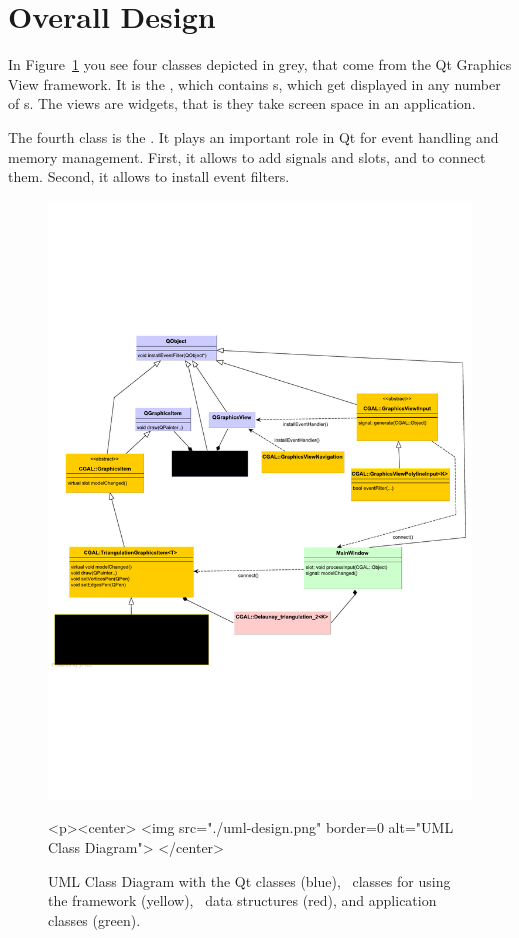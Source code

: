 \section{Overall Design}

In Figure~\ref{graphicsview:uml} you see four classes depicted in grey,
that come from the Qt Graphics View framework. It is the ,
which contains s, which get displayed in any number
of s. The views are widgets, that is they take screen space
in an application.

The fourth class is the . It plays an important role in Qt for
event handling and memory management. First, it allows to add signals and
slots, and to connect them.  Second, it allows to install event filters.


\begin{figure}[t]
\begin{ccTexOnly}
  \begin{center}
  \includegraphics[width=\linewidth]{GraphicsView/uml-design}
  \end{center}
\end{ccTexOnly}
\begin{ccHtmlOnly}
  <p><center>
  <img src="./uml-design.png" border=0 alt="UML Class Diagram">
  </center>
\end{ccHtmlOnly}
\caption{UML Class Diagram with the Qt classes (blue), \cgal\ classes for using the framework (yellow),
\cgal\ data structures (red), and application classes (green). \label{graphicsview:uml}}
\end{figure}

